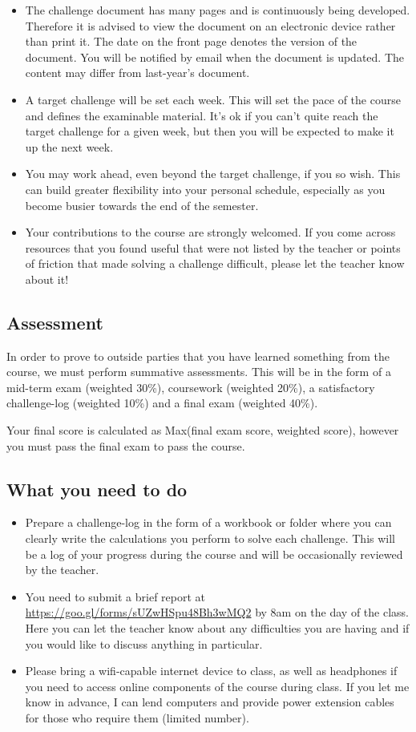 \begin{itemize}
    \item The challenge document has many pages and is continuously being developed. Therefore it is advised to view the document on an electronic device rather than print it. The date on the front page denotes the version of the document. You will be notified by email when the document is updated. The content may differ from last-year's document.
    \item A target challenge will be set each week. This will set the pace of the course and defines the examinable material. It's ok if you can't quite reach the target challenge for a given week, but then you will be expected to make it up the next week.
    \item You may work ahead, even beyond the target challenge, if you so wish. This can build greater flexibility into your personal schedule, especially as you become busier towards the end of the semester.
    \item Your contributions to the course are strongly welcomed. If you come across resources that you found useful that were not listed by the teacher or points of friction that made solving a challenge difficult, please let the teacher know about it!
\end{itemize}

\subsection{Assessment}
In order to prove to outside parties that you have learned something from the course, we must perform summative assessments. This will be in the form of a mid-term exam (weighted 30\%), coursework (weighted 20\%), a satisfactory challenge-log (weighted 10\%) and a final exam (weighted 40\%).

Your final score is calculated as Max(final exam score, weighted score), however you must pass the final exam to pass the course.

\subsection{What you need to do}
\begin{itemize}
    \item Prepare a challenge-log in the form of a workbook or folder where you can clearly write the calculations you perform to solve each challenge. This will be a log of your progress during the course and will be occasionally reviewed by the teacher.
    \item You need to submit a brief report at \url{https://goo.gl/forms/sUZwHSpu48Bh3wMQ2} by 8am on the day of the class. Here you can let the teacher know about any difficulties you are having and if you would like to discuss anything in particular.
    \item Please bring a wifi-capable internet device to class, as well as headphones if you need to access online components of the course during class. If you let me know in advance, I can lend computers and provide power extension cables for those who require them (limited number).
\end{itemize}
